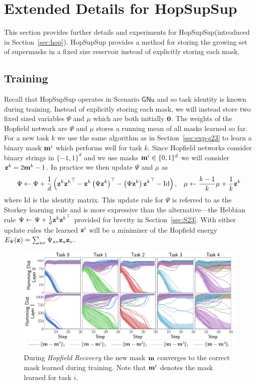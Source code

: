 \documentclass{article}
\newcommand{\ac}{SupSup\xspace}
\newcommand{\casename}[1]{\ensuremath{\mathsf{#1}}\xspace}
\begin{document}
\section{Extended Details for Hop\ac} \label{sec:hop-extended}

This section provides further details and experiments for Hop\ac (introduced in Section~\ref{sec:hop}). Hop\ac provides a method for storing the growing set of supermasks in a fixed size reservoir instead of explicitly storing each mask.
\subsection{Training}
Recall that Hop\ac operates in Scenario \casename{GNu} and so task identity is known during training. Instead of explicitly storing each mask, we will instead store two fixed sized variables $\Psi$ and  $\mu$ which are both initially $\mathbf{0}$. The weights of the Hopfield network are $\Psi$ and $\mu$ stores a running mean of all masks learned so far. For a new task $k$ we use the same algorithm as in Section~\ref{sec:exp-s23} to learn a binary mask $\mathbf{m}^i$ which performs well for task $k$. Since Hopfield networks consider binary strings in $\{-1,1\}^d$ and we use masks $\mathbf{m}^i \in \{0,1\}^d$ we will consider $\mathbf{z}^k = 2\mathbf{m}^k - 1$. In practice we then update $\Psi$ and $\mu$ as 
\begin{align}
    &\Psi \gets \Psi + \frac{1}{d}\left(  \mathbf{z}^k {\mathbf{z}^k}^\top - \mathbf{z}^k \left( \Psi \mathbf{z}^k \right)^\top - \left( \Psi \mathbf{z}^k \right) {\mathbf{z}^k}^\top -  \text{Id} \right),  & \mu \gets \frac{k-1}{k} \mu + \frac{1}{k} \mathbf{z}^k 
\end{align}
where Id is the identity matrix. This update rule for $\Psi$ is referred to as the Storkey learning rule \cite{storkey1997increasing} and is more expressive than the alternative---the Hebbian rule $\Psi \gets \Psi + \frac{1}{d} \mathbf{z}^k {\mathbf{z}^k}^\top$ \cite{hopfield1982neural} provided for brevity in Section~\ref{sec:S23}. With either update rules the learned $\mathbf{z}^i$ will be a minimizer of the Hopfield energy $E_{\Psi}(\mathbf{z}) = \sum_{uv} \Psi_{uv} \mathbf{z}_u \mathbf{z}_v$.
\begin{figure}[t]
    \centering
    \includegraphics[width=\textwidth]{figs/hd_crop.pdf}
    \caption{During \emph{Hopfield Recovery} the new mask $\mathbf{m}$ converges to the correct mask learned during training. Note that $\mathbf{m}^i$ denotes the mask learned for task $i$.}
    \label{fig:hop-infer}
\end{figure}
\end{document}
